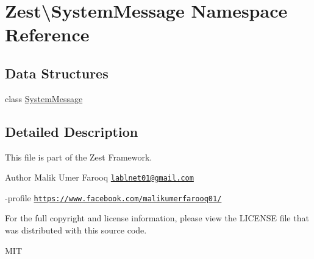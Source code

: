 \hypertarget{namespace_zest_1_1_system_message}{}\section{Zest\textbackslash{}System\+Message Namespace Reference}
\label{namespace_zest_1_1_system_message}
\subsection*{Data Structures}
\begin{DoxyCompactItemize}
\item 
class \mbox{\hyperlink{class_zest_1_1_system_message_1_1_system_message}{System\+Message}}
\end{DoxyCompactItemize}


\subsection{Detailed Description}
This file is part of the Zest Framework.

\begin{DoxyAuthor}{Author}
Malik Umer Farooq \href{mailto:lablnet01@gmail.com}{\tt lablnet01@gmail.\+com} 

-\/profile \href{https://www.facebook.com/malikumerfarooq01/}{\tt https\+://www.\+facebook.\+com/malikumerfarooq01/}
\end{DoxyAuthor}
For the full copyright and license information, please view the L\+I\+C\+E\+N\+SE file that was distributed with this source code.

M\+IT 